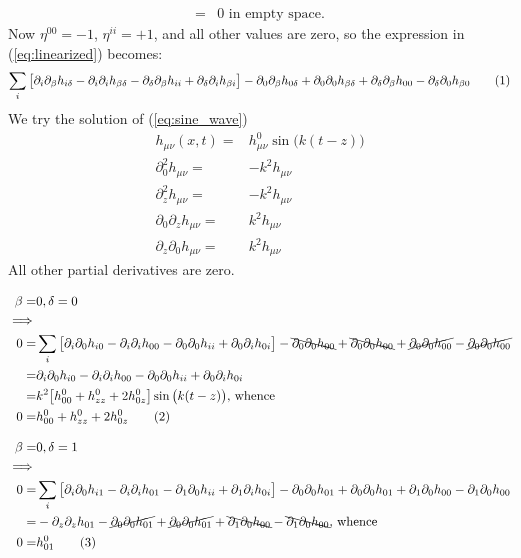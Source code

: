 \documentclass[]{article}
\newcommand\numberthis{\addtocounter{equation}{1}\tag{\theequation}}
\begin{document}
{\begin{appendices}
\begin{align*}
	=& 0 \text{ in empty space}.
	\end{align*}
	Now $\eta^{00}=-1$, $\eta^{ii}=+1$, and all other values are zero, so the expression in (\ref{eq:linearized}) becomes:
	\begin{align*}
		\sum_i\big[\partial_i\partial_\beta h_{i\delta} - \partial_i\partial_i h_{\beta\delta} -  \partial_\delta\partial_\beta h_{ii} + \partial_\delta\partial_i h_{\beta i}\big]-\partial_0\partial_\beta h_{0\delta} + \partial_0\partial_0 h_{\beta\delta} +  \partial_\delta\partial_\beta h_{00} - \partial_\delta\partial_0 h_{\beta 0} \numberthis \label{eq:expanded_h}
	\end{align*}
	We try the solution of (\ref{eq:sine_wave})
	\begin{align*}
		h_{\mu\nu}(x,t)=&h^0_{\mu\nu} \sin\big(k(t-z)\big)\\
		\partial_0^2 h_{\mu\nu}=& -k^2 h_{\mu\nu}\\
		\partial_z^2 h_{\mu\nu}=& -k^2 h_{\mu\nu}\\
		\partial_0 \partial_z  h_{\mu\nu}=& k^2 h_{\mu\nu}\\
		\partial_z \partial_0  h_{\mu\nu}=& k^2 h_{\mu\nu}
	\end{align*}
	All other partial derivatives are zero.
	
	\begin{align*}
	\beta=&0,\delta=0\\
	\implies&\\
	0 =&\sum_i\big[\partial_i\partial_0 h_{i0} - \partial_i\partial_i h_{00} -  \partial_0\partial_0 h_{ii} + \partial_0\partial_i h_{0 i}\big]-\bcancel{\partial_0\partial_0 h_{00}} + \bcancel{\partial_0\partial_0 h_{00}} +  \cancel{\partial_0\partial_0 h_{00}} - \cancel{\partial_0\partial_0 h_{0 0}}\\
	=& \partial_i\partial_0 h_{i0} - \partial_i\partial_i h_{00} -  \partial_0\partial_0 h_{ii} + \partial_0\partial_i h_{0 i}\\
	=& k^2\big[h^0_{00} + h^0_{zz}+2h^0_{0z}\big]\sin\big(k(t-z)\big) \text{, whence }\\
	0=&h^0_{00} + h^0_{zz}+2h^0_{0z} \numberthis \label{eq:h:00}
	\end{align*}
	
	\begin{align*}
	\beta=&0,\delta=1\\
	\implies&\\
	0 =&\sum_i\big[\partial_i\partial_0 h_{i1} - \partial_i\partial_i h_{01} -  \partial_1\partial_0 h_{ii} + \partial_1\partial_i h_{0 i}\big]-\partial_0\partial_0 h_{01} + \partial_0\partial_0 h_{01} +  \partial_1\partial_0 h_{00} - \partial_1\partial_0 h_{0 0}\\
	=& - \partial_z\partial_z h_{01}-\cancel{\partial_0\partial_0 h_{01}} + \cancel{\partial_0\partial_0 h_{01}} +  \bcancel{\partial_1\partial_0 h_{00}} - \bcancel{\partial_1\partial_0 h_{0 0}} \text{, whence}\\
	0=&h^0_{01} \numberthis \label{eq:h:01}
	\end{align*}
	

\end{appendices}}
\end{document}
